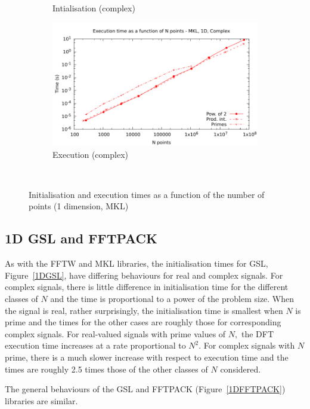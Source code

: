 \documentclass[12pt, a4paper]{article}
\begin{document}
\begin{figure}[htb]
\begin{subfigure}{.5\textwidth}
\caption{Intialisation (complex)}
\label{1DMKLCI}
\end{subfigure}%
\begin{subfigure}{.5\textwidth}
\centering
\includegraphics[width=.9\linewidth]{graphs/1d-mkl-exec-c.pdf}
\caption{Execution (complex)}
\label{1DMKLC}
\end{subfigure}\\
\caption{Initialisation and execution times as a function of the number of points (1 dimension, MKL)}
\label{1DMKL}
\end{figure}

\subsection{1D GSL and FFTPACK}
As with the FFTW and MKL libraries, the initialisation times for GSL, Figure~\ref{1DGSL}, have 
differing behaviours for real and complex signals. For complex signals, there is little difference 
in initialisation time for the different classes of $N$ and the time is proportional to a power of 
the problem size. When the signal is real, rather surprisingly, the initialisation time is smallest 
when $N$ is prime and the times for the other cases are roughly those for corresponding complex 
signals. For real-valued signals with prime values of $N,$ the DFT execution time increases at a 
rate proportional to $N^2.$ For complex signals with $N$ prime, there is a much slower increase 
with respect to execution time and the times are roughly 2.5 times those of the other classes of 
$N$ considered.

The general behaviours of the GSL and FFTPACK (Figure~\ref{1DFFTPACK}) libraries are similar.  
\end{document}
